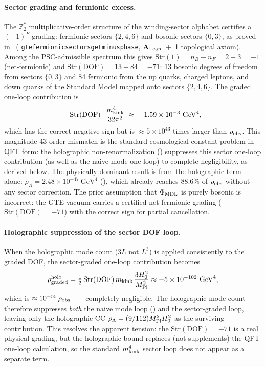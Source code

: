 \documentclass[11pt]{article}
\theoremstyle{remark}
\newcommand{\ZT}{\mathbb{Z}_2}
\newcommand{\lean}[1]{%
  \penalty-100
  \begingroup\def\_{\textunderscore\allowbreak}\texttt{#1}\endgroup}
\newcommand{\MPl}{M_{\rm Pl}}
\newcommand{\Hnought}{H_0}
\newcommand{\CatAL}{\ensuremath{\textbf{A}_{\rm Lean}}}
\begin{document}
\paragraph{Sector grading and fermionic excess.}
The $\ZT^*$ multiplicative-order structure of the winding-sector alphabet certifies
a $(-1)^F$ grading: fermionic sectors $\{2,4,6\}$ and bosonic sectors $\{0,3\}$,
as proved in~\cite{SpivackThreeTapeCMCA}
(\lean{gte\_fermionic\_sectors\_get\_minus\_phase}, \CatAL~+~1 topological axiom).
Among the PSC-admissible spectrum this gives $\text{Str}(1) = n_B - n_F = 2 - 3 = -1$
(net-fermionic) and $\text{Str}(\text{DOF}) = 13 - 84 = -71$: 13 bosonic degrees
of freedom from sectors $\{0,3\}$ and 84 fermionic from the up quarks, charged
leptons, and down quarks of the Standard Model mapped onto sectors $\{2,4,6\}$.
The graded one-loop contribution is
\[
  -\text{Str}(\text{DOF})\cdot\frac{m_{\rm kink}^4}{32\pi^2}
  \;\approx\; -1.59\times10^{-3}~\text{GeV}^4,
\]
which has the correct negative sign but is $\approx 5\times10^{43}$ times larger
than $\rho_{\rm obs}$.  This magnitude-43-order mismatch is the standard cosmological
constant problem in QFT form: the holographic non-renormalization
() suppresses this sector one-loop contribution (as well as the
naive mode one-loop) to complete negligibility, as derived below.  The physically dominant result is from the holographic term alone:
$\rho_\Lambda = 2.48\times10^{-47}~\text{GeV}^4$ (), which
already reaches $88.6\%$ of $\rho_{\rm obs}$ without any sector correction.  The
prior assumption that $\Phi_{\rm MDL}$ is purely bosonic is incorrect: the GTE
vacuum carries a certified net-fermionic grading ($\text{Str}(\text{DOF}) = -71$)
with the correct sign for partial cancellation.

\paragraph{Holographic suppression of the sector DOF loop.}
\label{sec:cc-sector}
When the holographic mode count ($3L$ not $L^3$) is applied consistently to
the graded DOF, the sector-graded one-loop contribution becomes
\begin{equation}
  \rho_{\rm graded}^{\rm holo} = \tfrac{1}{2}\,\text{Str}(\text{DOF})\,
  m_{\rm kink}\,\frac{3\Hnought^2}{\MPl^2}
  \approx -5\times10^{-102}\ \text{GeV}^4,
\end{equation}
which is $\approx 10^{-55}\,\rho_{\rm obs}$~---~completely negligible.
The holographic mode count therefore suppresses \emph{both} the naive mode loop
() and the sector-graded loop, leaving only the holographic
CC $\rho_\Lambda = (9/112)\MPl^2\Hnought^2$ as the surviving contribution.
This resolves the apparent tension: the $\text{Str}(\text{DOF}) = -71$ is a
real physical grading, but the holographic bound replaces (not supplements) the
QFT one-loop calculation, so the standard $m_{\rm kink}^4$ sector loop does not
appear as a separate term.
\end{document}
